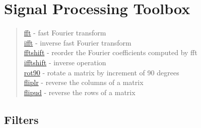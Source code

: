 \chapter*{Signal Processing Toolbox}

\begin{quote}
\noindent
\hyperlink{fft}{fft} - {fast Fourier transform} \\
\hyperlink{ifft}{ifft} - {inverse fast Fourier transform} \\
\hyperlink{fftshift}{fftshift} - {reorder the Fourier coefficients computed by fft} \\
\hyperlink{ifftshift}{ifftshift} - {inverse operation} \\
\hyperlink{rot90}{rot90} - {rotate a matrix by increment of 90 degrees} \\
\hyperlink{fliplr}{fliplr} - {reverse the columns of a matrix} \\
\hyperlink{flipud}{flipud} - {reverse the rows of a matrix} \\
\end{quote}

 
 
 

\section*{Filters}

